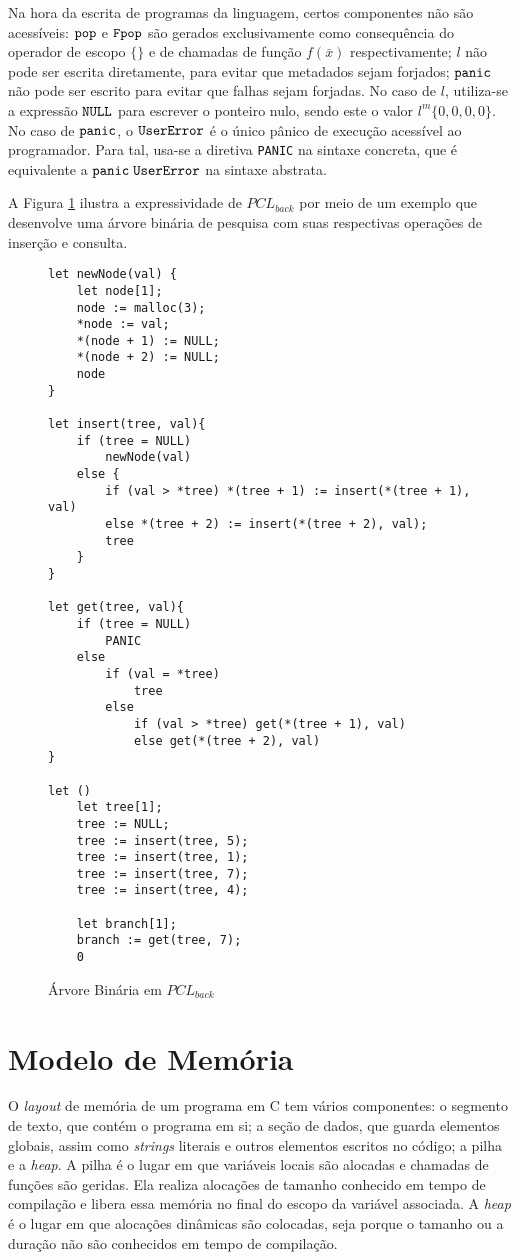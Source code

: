 Na hora da escrita de programas da linguagem, certos componentes não são acessíveis: $\texttt{pop}$ e $\texttt{Fpop}$ são gerados exclusivamente como consequência do operador de escopo $\{\}$ e de chamadas de função $f(\bar x)$ respectivamente; $l$ não pode ser escrita diretamente, para evitar que metadados sejam forjados; $\texttt{panic}$ não pode ser escrito para evitar que falhas sejam forjadas. No caso de $l$, utiliza-se a expressão $\texttt{NULL}$ para escrever o ponteiro nulo, sendo este o valor $l^m\{0, 0, 0, 0\}$. No caso de $\texttt{panic}$, o $\texttt{UserError}$ é o único pânico de execução acessível ao programador. Para tal, usa-se a diretiva \texttt{PANIC} na sintaxe concreta, que é equivalente a $\texttt{panic}\;\texttt{UserError}$ na sintaxe abstrata.

A Figura \ref{lst:pclback:tree} ilustra a expressividade de $PCL_{back}$ por meio de um exemplo que desenvolve uma árvore binária de pesquisa com suas respectivas operações de inserção e consulta.

\begin{figure}[ht]
	\caption{Árvore Binária em $PCL_{back}$}
	\label{lst:pclback:tree}
	\begin{lstlisting}[language=PCLback]
let newNode(val) {
	let node[1];
	node := malloc(3);
	*node := val;
	*(node + 1) := NULL;
	*(node + 2) := NULL;
	node
}

let insert(tree, val){
	if (tree = NULL) 
		newNode(val)
	else {
		if (val > *tree) *(tree + 1) := insert(*(tree + 1), val)
		else *(tree + 2) := insert(*(tree + 2), val);
		tree
	}
}

let get(tree, val){
	if (tree = NULL) 
		PANIC
	else
		if (val = *tree)
			tree
		else
			if (val > *tree) get(*(tree + 1), val)
			else get(*(tree + 2), val)
}

let () 
	let tree[1];
	tree := NULL;
	tree := insert(tree, 5);
	tree := insert(tree, 1);
	tree := insert(tree, 7);
	tree := insert(tree, 4);

	let branch[1];
	branch := get(tree, 7);
	0
	\end{lstlisting}
\end{figure}
\FloatBarrier

\section{Modelo de Memória}
\label{sec:memory-model}

O \emph{layout} de memória de um programa em C tem vários componentes: o segmento de texto, que contém o programa em si; a seção de dados, que guarda elementos globais, assim como \emph{strings} literais e outros elementos escritos no código; a pilha e a \emph{heap}. A pilha é o lugar em que variáveis locais são alocadas e chamadas de funções são geridas. Ela realiza alocações de tamanho conhecido em tempo de compilação e libera essa memória no final do escopo da variável associada. A \emph{heap} é o lugar em que alocações dinâmicas são colocadas, seja porque o tamanho ou a duração não são conhecidos em tempo de compilação.

